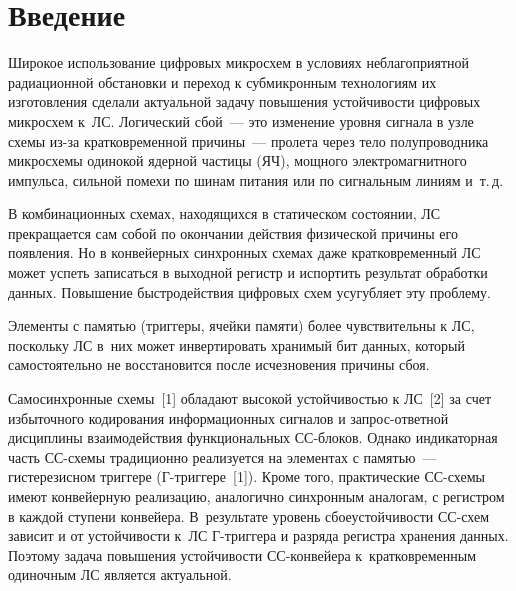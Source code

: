 
  



\thispagestyle{headings}

\begin{multicols}{2}

\label{st\stat}

\section{Введение}

  Широкое использование цифровых микросхем в условиях неблагоприятной 
радиационной обстановки и переход к субмикронным технологиям их 
изготовления сделали актуальной задачу повышения устойчивости цифровых 
микросхем к~ЛС. Логический сбой~--- это изменение 
уровня сигнала в узле схемы из-за кратковременной причины~--- пролета 
через тело полупроводника мик\-ро\-схе\-мы одинокой ядерной частицы (ЯЧ), 
мощного электромагнитного импульса, сильной помехи по шинам питания 
или по сигнальным линиям и~т.\,д.
  
  В комбинационных схемах, находящихся в статическом состоянии, ЛС 
прекращается сам собой по окончании действия физической причины его 
появления. Но в конвейерных синхронных схемах даже кратковременный ЛС 
может успеть записаться в выходной регистр и испортить результат 
обработки данных. Повышение быстродействия цифровых схем усугубляет 
эту проблему. 
  
  Элементы с памятью (триггеры, ячейки памяти) более чувствительны к ЛС, 
поскольку ЛС в~них может инвертировать хранимый бит данных, который 
самостоятельно не восстановится после исчезновения причины сбоя.
  
  Самосинхронные схемы~[1] обладают высокой устойчивостью к 
ЛС~[2] за счет избыточного кодирования информационных сигналов и зап\-рос-от\-вет\-ной дисциплины взаимодействия функциональных СС-бло\-ков. 
Однако индикаторная часть СС-схе\-мы традиционно реализуется на 
элементах с па\-мятью~--- гистерезисном триггере 
  (Г-триг\-ге\-ре~[1]). Кроме того, практические СС-схе\-мы имеют 
конвейерную реализацию, аналогично синхронным аналогам, с регистром в 
каждой ступени \mbox{конвейера}. В~результате уровень сбоеустойчивости СС-схем 
зависит и от устойчивости  
к~ЛС Г-триг\-ге\-ра и разряда регистра хранения данных.
       Поэтому задача повышения устойчивости СС-кон\-вей\-ера 
     к~кратковременным одиночным ЛС является актуальной. 


\end{multicols}

